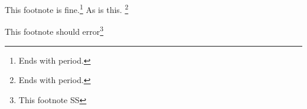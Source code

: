 \documentclass{article}
\begin{document}
This footnote is fine.\footnote{Ends with period.}
As is this.%
	\footnote{Ends with period.}

This footnote should error\footnote{This 
footnote
SS}
\end{document}

